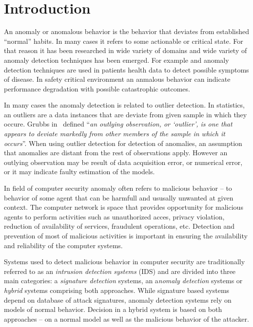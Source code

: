 
\chapter{Introduction}

An anomaly or anomalous behavior is the behavior that deviates from established ``normal'' habits.
In many cases it refers to some actionable or critical state. For that reason it has been 
researched in wide variety of domains and wide variety of anomaly detection techniques has been emerged.
For example and anomaly detection techniques are used in patients health data to detect possible
symptoms of disease. In safety critical environment an anmalous behavior can indicate
performance degradation with possible catastrophic outcomes.

In many cases the anomaly detection is related to outlier detection.
In statistics, an outliers are a data instances that are deviate from given sample in which 
they occure. Grubbs in~\cite{grubbs1969procedures} defined ``\emph{an outlying observation, 
or `outlier', is one that appears to deviate markedly from other members of the sample in which it occurs}''.
 When using outlier detection for detection of anomalies, an assumption 
that anomalies are distant from the rest of observations apply. However an outlying observation 
may be result of data acquisition error, or numerical error, or it may indicate faulty estimation of the models.

In field of computer security anomaly often refers to malicious behavior -- to behavior of some 
agent that can be harmfull and ususally unwanted at given context. 
The computer network is space that provides opportunity for malicious agents to perform activities such
as unauthorized acces, privacy violation, reduction of availability of services, fraudulent operations, etc.
Detection and prevention of most of malicious activities is important in ensuring the 
availability and reliability of the computer systems. 

Systems used to detect malicious behavior in computer security are traditionally referred to as an
\emph{intrusion detection systems} (IDS) and are divided into three main categories: a \emph{signature detection}
systems, an a\emph{nomaly detection} systems or \emph{hybrid} systems comprising both approaches. While signature
based systems depend on database of attack signatures, anomaly detection systems rely on 
models of normal behavior. Decision in a hybrid system is based on both approaches --
on a normal model as well as the malicious behavior of the attacker.

